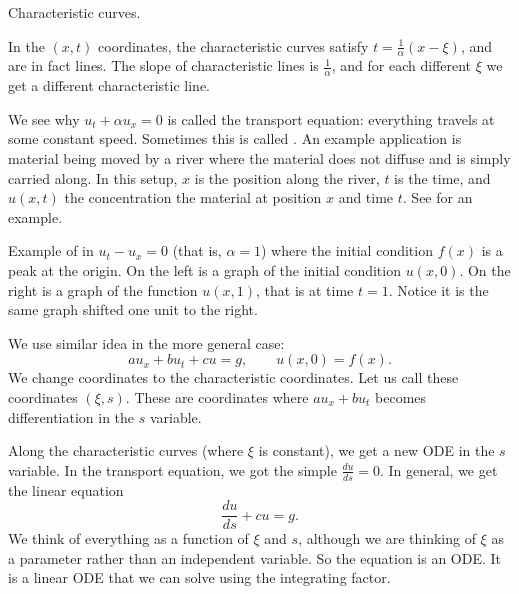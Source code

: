 \begin{example}
\begin{mywrapfig}{2.8in}
\capstart
{}
\caption{Characteristic curves.\label{fopde:charcurves}}
\end{mywrapfig}

In the $(x,t)$ coordinates, the characteristic curves satisfy 
$t = \frac{1}{\alpha} ( x- \xi)$, and are in fact lines.
The slope of characteristic lines is
$\frac{1}{\alpha}$, and for each different $\xi$ we get a different
characteristic line.

We see why $u_t + \alpha u_x = 0$ is called the
transport equation: everything travels at some constant speed.
Sometimes this is called \emph{}.
An example application is material being moved by a river where the material
does not diffuse and is simply carried along.  In this setup, $x$ is 
the position along the river, $t$ is the time, and $u(x,t)$ the concentration the
material at position $x$ and time $t$.  See
 for an example.
\begin{myfig}
\capstart
\caption{Example of 
in $u_t-u_x = 0$ (that is, $\alpha = 1$) where the
initial condition $f(x)$ is a peak at the origin.  On the left is a graph
of the initial condition $u(x,0)$.  On the right is a graph of
the function $u(x,1)$, that is at time $t=1$.  Notice it is the same
graph shifted one unit to
the right.\label{fopde:transportfig}}
\end{myfig}
\end{example}

We use similar idea in the more general case:
\begin{equation*}
a u_x + b u_t + c u = g, \qquad u(x,0) = f(x)  .
\end{equation*}
We change coordinates to the
characteristic coordinates. Let us call these coordinates $(\xi,s)$.
These are coordinates where $a u_x + b u_t$ becomes differentiation
in the $s$ variable.

Along the characteristic curves (where $\xi$ is constant), we get a
new ODE in the $s$ variable.  In the transport
equation, we got the simple $\frac{du}{ds} = 0$.  In general,
we get the linear equation
\begin{equation} \label{eq:fopde:charode}
\frac{du}{ds} + c u = g.
\end{equation}
We think of everything as a function of $\xi$ and $s$,
although
we are thinking of $\xi$ as a parameter rather than an independent variable.
So the equation is an ODE\@.  It is a linear
ODE that we can solve using the integrating factor.

